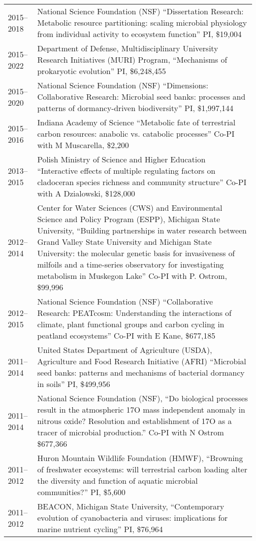 \documentclass[11pt]{article}  %
\begin{document}
\begin{tabularx}{\textwidth}{@{}l@{\hspace{2em}}X@{}}
2015--2018 & National Science Foundation (NSF) “Dissertation Research: Metabolic resource partitioning: scaling microbial physiology from individual activity to ecosystem function” PI, \$19,004 \\
2015--2022 & Department of Defense, Multidisciplinary University Research Initiatives (MURI) Program, “Mechanisms of prokaryotic evolution” PI, \$6,248,455 \\
2015--2020 & National Science Foundation (NSF) “Dimensions: Collaborative Research: Microbial seed banks: processes and patterns of dormancy-driven biodiversity” PI, \$1,997,144 \\
2015--2016 & Indiana Academy of Science “Metabolic fate of terrestrial carbon resources: anabolic vs. catabolic processes” Co-PI with M Muscarella, \$2,200 \\
2013--2015 & Polish Ministry of Science and Higher Education “Interactive effects of multiple regulating factors on cladoceran species richness and community structure” Co-PI with A Dzialowski, \$128,000 \\
2012--2014 & Center for Water Sciences (CWS) and Environmental Science and Policy Program (ESPP), Michigan State University, “Building partnerships in water research between Grand Valley State University and Michigan State University: the molecular genetic basis for invasiveness of milfoils and a time-series observatory for investigating metabolism in Muskegon Lake” Co-PI with P. Ostrom, \$99,996 \\
2012--2015 & National Science Foundation (NSF) “Collaborative Research: PEATcosm: Understanding the interactions of climate, plant functional groups and carbon cycling in peatland ecosystems” Co-PI with E Kane, \$677,185 \\
2011--2014 & United States Department of Agriculture (USDA), Agriculture and Food Research Initiative (AFRI) “Microbial seed banks: patterns and mechanisms of bacterial dormancy in soils” PI, \$499,956 \\
2011--2014 & National Science Foundation (NSF), “Do biological processes result in the atmospheric 17O mass independent anomaly in nitrous oxide? Resolution and establishment of 17O as a tracer of microbial production.” Co-PI with N Ostrom \$677,366 \\
2011--2012 & Huron Mountain Wildlife Foundation (HMWF), “Browning of freshwater ecosystems: will terrestrial carbon loading alter the diversity and function of aquatic microbial communities?” PI, \$5,600 \\
2011--2012 & BEACON, Michigan State University, “Contemporary evolution of cyanobacteria and viruses: implications for marine nutrient cycling” PI, \$76,964 \\

\end{tabularx}
\end{document}
